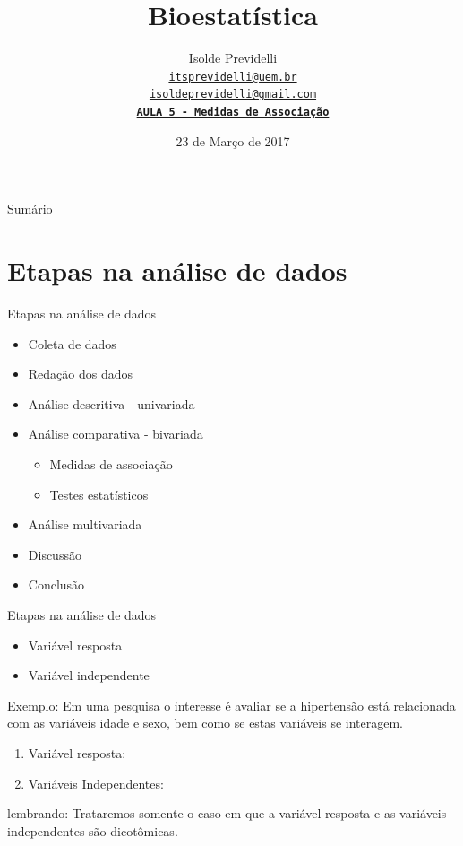 \documentclass[9pt]{beamer}
\title[Bioestatística]{\bf Bioestatística\\
\vspace{.3\baselineskip}}
\subtitle[]{\bf}
\date{ 23 de Março de 2017}
\author[Isolde Previdelli]{
  Isolde Previdelli\\
  \href{itsprevidelli@uem.br}{{\tt itsprevidelli@uem.br \\
isoldeprevidelli@gmail.com \\ \vspace{8mm} \tt \textbf{\LARGE{AULA 5 -
    Medidas de Associação}}}}
}
\institute[PBE/UEM]{}
\begin{document}
{\pbebg
\begin{frame}
  \titlepage
\end{frame}}

\begin{frame}{Sumário}{}
\tableofcontents
\end{frame}

\section{Etapas na análise de dados}

\begin{frame}{Etapas na análise de dados}{}

\begin{itemize}

\item Coleta de dados
\item Redação dos dados
\item Análise descritiva - univariada
\item Análise comparativa - bivariada
  \begin{itemize}
    \item Medidas de associação
    \item Testes estatísticos
  \end{itemize}
\item Análise multivariada
\item Discussão
\item Conclusão
\end{itemize}

\end{frame}


\begin{frame}{Etapas na análise de dados}{}


\begin{itemize}
\item Variável resposta
\item Variável independente
\end{itemize}
\indent

Exemplo: Em uma pesquisa o interesse é avaliar se a hipertensão está
relacionada com as variáveis idade e sexo, bem como se estas variáveis
se interagem.

\begin{enumerate}
  \item Variável resposta:
  \item Variáveis Independentes:
\end{enumerate}

lembrando: Trataremos somente o caso em que a variável resposta e as
variáveis independentes são dicotômicas.

\end{frame}
\end{document}
